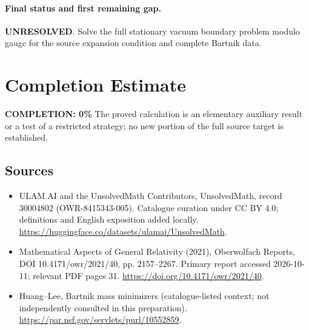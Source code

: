 \documentclass[11pt]{article}
\begin{document}
\paragraph{Final status and first remaining gap.}
\textbf{UNRESOLVED}. Solve the full stationary vacuum boundary problem modulo gauge for the source expansion condition and complete Bartnik data.

\section{Completion Estimate}
\noindent\textbf{COMPLETION: 0\%}
The proved calculation is an elementary auxiliary result or a test of a restricted strategy; no new portion of the full source target is established.

\subsection{Sources}
\begin{itemize}
\item[\hypertarget{source:30004802:1}{S1}] ULAM.AI and the UnsolvedMath Contributors, UnsolvedMath, record 30004802 (OWR-8415343-005). Catalogue curation under CC BY 4.0; definitions and English exposition added locally.
\url{https://huggingface.co/datasets/ulamai/UnsolvedMath}.
\item[\hypertarget{source:30004802:2}{S2}] Mathematical Aspects of General Relativity (2021), Oberwolfach Reports, DOI 10.4171/owr/2021/40, pp. 2157--2267. Primary report accessed 2026-10-11; relevant PDF pages 31.
\url{https://doi.org/10.4171/owr/2021/40}.
\item[\hypertarget{source:30004802:3}{S3}] Huang--Lee, Bartnik mass minimizers (catalogue-listed context; not independently consulted in this preparation).
\url{https://par.nsf.gov/servlets/purl/10552859}.
\end{itemize}
\label{end:30004802}
\end{document}
